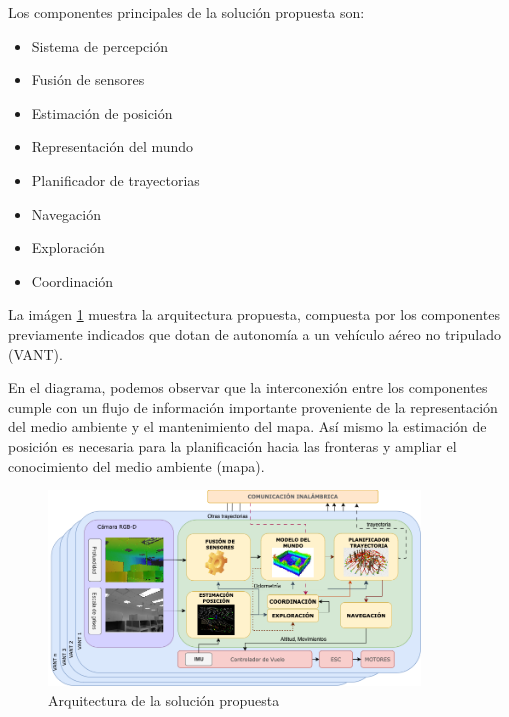 
Los componentes principales de la solución propuesta son:

\begin{itemize}\setlength{\itemsep}{-1mm}
\item Sistema de percepción
\item Fusión de sensores
\item Estimación de posición
\item Representación del mundo
\item Planificador de trayectorias
\item Navegación
\item Exploración
\item Coordinación
\end{itemize}

La imágen \ref{fig:arq} muestra la arquitectura propuesta, compuesta por los componentes previamente indicados que dotan de autonomía a un vehículo aéreo no tripulado (VANT).

En el diagrama, podemos observar que la interconexión entre los componentes cumple con un flujo de información importante proveniente de la representación del medio ambiente y el mantenimiento del mapa. Así mismo la estimación de posición es necesaria para la planificación hacia las fronteras y ampliar el conocimiento del medio ambiente (mapa).

\begin{figure}[h]
\centering
\includegraphics[width=0.88\textwidth]{images/arquitectura}
\caption{Arquitectura de la solución propuesta}
\label{fig:arq}
\end{figure}

